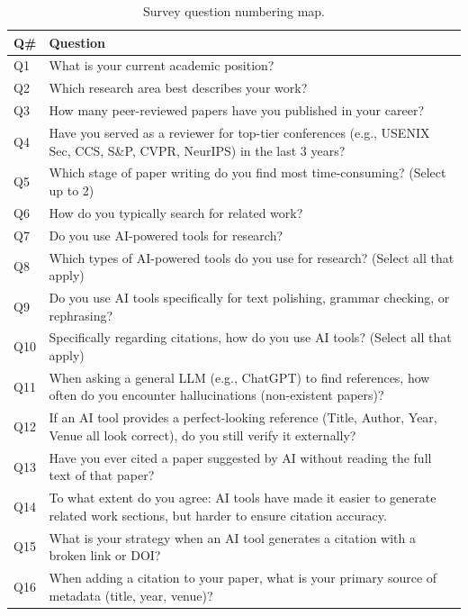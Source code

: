 
\begin{table}[htbp]
\centering
\caption{Survey question numbering map.}
\label{tab:survey_question_map}
\small
\begin{threeparttable}
\begin{tabular}{p{1.2cm}p{14.2cm}}
\toprule
\textbf{Q\#} & \textbf{Question} \\
\midrule
Q1 & What is your current academic position? \\
Q2 & Which research area best describes your work? \\
Q3 & How many peer-reviewed papers have you published in your career? \\
Q4 & Have you served as a reviewer for top-tier conferences (e.g., USENIX Sec, CCS, S\&P, CVPR, NeurIPS) in the last 3 years? \\
Q5 & Which stage of paper writing do you find most time-consuming? (Select up to 2) \\
Q6 & How do you typically search for related work? \\
Q7 & Do you use AI-powered tools for research? \\
Q8 & Which types of AI-powered tools do you use for research? (Select all that apply) \\
Q9 & Do you use AI tools specifically for text polishing, grammar checking, or rephrasing? \\
Q10 & Specifically regarding citations, how do you use AI tools? (Select all that apply) \\
Q11 & When asking a general LLM (e.g., ChatGPT) to find references, how often do you encounter hallucinations (non-existent papers)? \\
Q12 & If an AI tool provides a perfect-looking reference (Title, Author, Year, Venue all look correct), do you still verify it externally? \\
Q13 & Have you ever cited a paper suggested by AI without reading the full text of that paper? \\
Q14 & To what extent do you agree: AI tools have made it easier to generate related work sections, but harder to ensure citation accuracy. \\
Q15 & What is your strategy when an AI tool generates a citation with a broken link or DOI? \\
Q16 & When adding a citation to your paper, what is your primary source of metadata (title, year, venue)? \\

\end{tabular}
\end{threeparttable}
\end{table}
